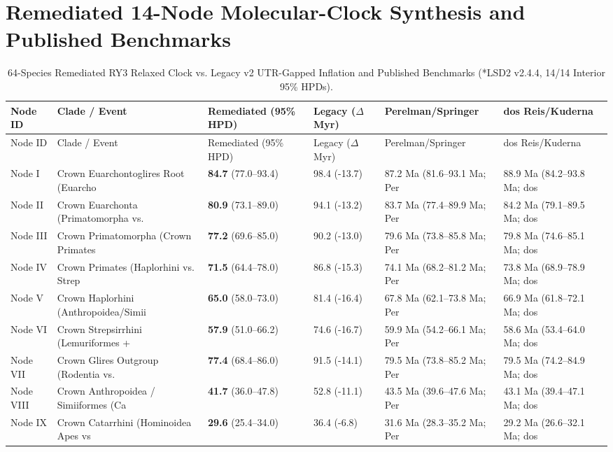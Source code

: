 \documentclass[10pt,letterpaper]{article}
\begin{document}
\section{Remediated 14-Node Molecular-Clock Synthesis and Published Benchmarks}
\begin{longtable}{llllll}
\caption{64-Species Remediated RY3 Relaxed Clock vs. Legacy v2 UTR-Gapped Inflation and Published Benchmarks (*LSD2 v2.4.4, 14/14 Interior 95\% HPDs).} \\
\toprule
Node ID & Clade / Event & Remediated (95\% HPD) & Legacy ($\Delta$ Myr) & Perelman/Springer & dos Reis/Kuderna \\
\midrule
\endfirsthead
\toprule
Node ID & Clade / Event & Remediated (95\% HPD) & Legacy ($\Delta$ Myr) & Perelman/Springer & dos Reis/Kuderna \\
\midrule
\endhead
Node I & Crown Euarchontoglires Root (Euarcho & \textbf{84.7} (77.0--93.4) & 98.4 (-13.7) & 87.2 Ma (81.6--93.1 Ma; Per & 88.9 Ma (84.2--93.8 Ma; dos \\
Node II & Crown Euarchonta (Primatomorpha vs.  & \textbf{80.9} (73.1--89.0) & 94.1 (-13.2) & 83.7 Ma (77.4--89.9 Ma; Per & 84.2 Ma (79.1--89.5 Ma; dos \\
Node III & Crown Primatomorpha (Crown Primates  & \textbf{77.2} (69.6--85.0) & 90.2 (-13.0) & 79.6 Ma (73.8--85.8 Ma; Per & 79.8 Ma (74.6--85.1 Ma; dos \\
Node IV & Crown Primates (Haplorhini vs. Strep & \textbf{71.5} (64.4--78.0) & 86.8 (-15.3) & 74.1 Ma (68.2--81.2 Ma; Per & 73.8 Ma (68.9--78.9 Ma; dos \\
Node V & Crown Haplorhini (Anthropoidea/Simii & \textbf{65.0} (58.0--73.0) & 81.4 (-16.4) & 67.8 Ma (62.1--73.8 Ma; Per & 66.9 Ma (61.8--72.1 Ma; dos \\
Node VI & Crown Strepsirrhini (Lemuriformes +  & \textbf{57.9} (51.0--66.2) & 74.6 (-16.7) & 59.9 Ma (54.2--66.1 Ma; Per & 58.6 Ma (53.4--64.0 Ma; dos \\
Node VII & Crown Glires Outgroup (Rodentia vs.  & \textbf{77.4} (68.4--86.0) & 91.5 (-14.1) & 79.5 Ma (73.8--85.2 Ma; Per & 79.5 Ma (74.2--84.9 Ma; dos \\
Node VIII & Crown Anthropoidea / Simiiformes (Ca & \textbf{41.7} (36.0--47.8) & 52.8 (-11.1) & 43.5 Ma (39.6--47.6 Ma; Per & 43.1 Ma (39.4--47.1 Ma; dos \\
Node IX & Crown Catarrhini (Hominoidea Apes vs & \textbf{29.6} (25.4--34.0) & 36.4 (-6.8) & 31.6 Ma (28.3--35.2 Ma; Per & 29.2 Ma (26.6--32.1 Ma; dos \\

\end{longtable}
\end{document}
